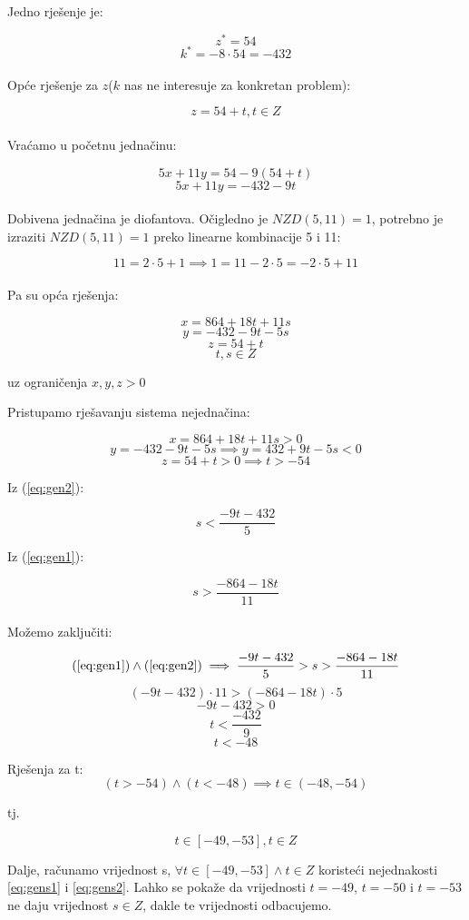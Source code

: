 \documentclass[12pt]{article}
\begin{document}
Jedno rješenje je:

$$z^{*} = 54$$
$$k^{*} = - 8 \cdot 54 = - 432$$\\

Opće rješenje za $z$($k$ nas ne interesuje za konkretan problem):

$$z = 54 + t, t\in Z$$\\

Vraćamo u početnu jednačinu:

$$5x + 11y = 54 - 9(54 + t)$$
$$5x + 11y = -432 - 9t$$\\

Dobivena jednačina je diofantova. Očigledno je $NZD(5, 11) = 1$, potrebno je izraziti $NZD(5, 11) = 1$ preko linearne kombinacije 5 i 11:

$$11 = 2 \cdot 5 + 1 \implies 1 = 11 - 2 \cdot 5 = - 2 \cdot 5 + 11$$\\

Pa su opća rješenja:

$$x = 864 + 18t + 11s$$
$$y = -432 - 9t - 5s$$
$$z = 54 + t$$
$$t, s\in Z$$
\begin{center}
uz ograničenja $x, y, z > 0$
\end{center}

Pristupamo rješavanju sistema nejednačina:

\[
x = 864 + 18t + 11s > 0 \label{eq:gen1} \tag{1}
\]
\[
y = -432 - 9t - 5s \implies y = 432 + 9t - 5s < 0 \label{eq:gen2} \tag{2}
\]
$$z = 54 + t > 0 \implies t > - 54$$

Iz (\ref{eq:gen2}):

\[
s < \frac{- 9t - 432}{5} \label{eq:gens1} \tag{A}
\]

Iz (\ref{eq:gen1}):

\[
s > \frac{- 864 - 18t}{11} \label{eq:gens2} \tag{B}
\]\\

Možemo zaključiti:

$$(\ref{eq:gen1}) \land (\ref{eq:gen2}) \implies \frac{- 9t - 432}{5} > s > \frac{- 864 - 18t}{11}$$
$$(- 9t - 432) \cdot 11 > (- 864 - 18t) \cdot 5$$
$$- 9t - 432 > 0$$
$$t < \frac{- 432}{9}$$
$$t < -48$$\vspace{1mm}

Rješenja za t: 
$$(t > -54) \land (t < -48) \implies t\in (-48, -54)$$

tj. 

$$t\in [-49, -53], t\in Z$$\vspace{1mm}

Dalje, računamo vrijednost s, $\forall t\in [-49, -53] \land t\in Z$ koristeći nejednakosti \ref{eq:gens1} i \ref{eq:gens2}. Lahko se pokaže da vrijednosti $t = - 49$, $t = - 50$ i $t = - 53$ ne daju vrijednost $s \in Z$, dakle te vrijednosti odbacujemo.\vspace{1mm}
\end{document}

